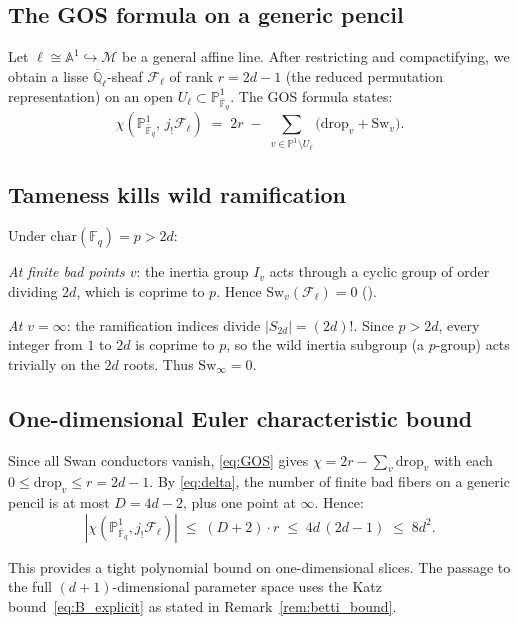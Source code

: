 \documentclass[11pt, a4paper]{article}
\theoremstyle{definition}
\theoremstyle{remark}
\newcommand{\Fq}{\mathbb{F}_q}
\newcommand{\Fqbar}{\overline{\mathbb{F}}_q}
\newcommand{\Proj}{\mathbb{P}^1}
\newcommand{\Affine}{\mathbb{A}}
\newcommand{\Sw}{\mathrm{Sw}}
\newcommand{\drop}{\mathrm{drop}}
\begin{document}
\subsection{The GOS formula on a generic pencil}

Let $\ell \cong \Affine^1 \hookrightarrow \mathcal{M}$ be a
general affine line.
After restricting and compactifying, we obtain a lisse
$\overline{\mathbb{Q}}_\ell$-sheaf $\mathcal{F}_\ell$
of rank $r = 2d - 1$
(the reduced permutation representation) on an open
$U_\ell \subset \Proj_{\Fqbar}$.
The GOS formula \cite{grothendieck1977, raynaud1965, serre1979}
states:
\begin{equation}\label{eq:GOS}
    \chi(\Proj_{\Fqbar},\, j_! \mathcal{F}_\ell)
    \;=\; 2r
    \;-\; \sum_{v \in \Proj \setminus U_\ell}
    \bigl(\drop_v + \Sw_v\bigr).
\end{equation}

\subsection{Tameness kills wild ramification}

Under $\mathrm{char}(\Fq) = p > 2d$:

\emph{At finite bad points $v$}: the inertia group
$I_v$ acts through a cyclic group of order dividing $2d$,
which is coprime to $p$.
Hence $\Sw_v(\mathcal{F}_\ell) = 0$
(\cite[IV, \S2, Cor.~1]{serre1979}).

\emph{At $v = \infty$}: the ramification indices divide $|S_{2d}|
= (2d)!$.
Since $p > 2d$, every integer from $1$ to $2d$ is coprime to $p$,
so the wild inertia subgroup (a $p$-group) acts trivially on the
$2d$ roots.
Thus $\Sw_\infty = 0$.

\subsection{One-dimensional Euler characteristic bound}

Since all Swan conductors vanish, \eqref{eq:GOS} gives
$\chi = 2r - \sum_v \drop_v$ with each
$0 \le \drop_v \le r = 2d - 1$.
By \eqref{eq:delta}, the number of finite bad fibers on a generic
pencil is at most $D = 4d - 2$, plus one point at $\infty$.
Hence:
\begin{equation}\label{eq:chi_1d}
    |\chi(\Proj_{\Fqbar}, j_!\mathcal{F}_\ell)|
    \;\le\; (D + 2) \cdot r
    \;\le\; 4d\,(2d-1)
    \;\le\; 8d^2.
\end{equation}

This provides a tight polynomial bound on one-dimensional slices.
The passage to the full $(d+1)$-dimensional parameter space
uses the Katz bound~\eqref{eq:B_explicit} as stated in
Remark~\ref{rem:betti_bound}.
\end{document}
